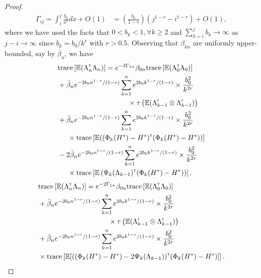 \begin{proof}
\begin{align*}
\Gamma_{ij} = \int_i^j \frac{b_0}{x^r} dx + O(1) &= \left(\frac{b_0}{1-r}\right)(j^{1-r}-i^{1-r}) +O(1),
\end{align*}
where we have used the facts that $0 < b_k < 1, \forall k \ge 2$ and 
$\sum_{k=i}^j b_k \to \infty$ as $j-i \to \infty$ since 
$b_k = b_0/k^r$ with $r > 0.5$.
Observing that $\beta_{kn}$ are uniformly upper-bounded, say by $\bar \beta_n$, we have
\begin{align}\label{eq:thmwts}
 & \text{trace} \left[\E (\Lambda_n \tr \Lambda_n)\right] =  e^{-2 \Gamma_{1n}} \beta_{0n} \text{trace} \left[\E (\Lambda_0 \tr \Lambda_0)\right]  \nonumber\\ 
&+ \bar \beta_n e^{-2 b_0 n^{1-r}/(1-r)} \sum_{k=1}^n e^{2 b_0 k^{1-r}/(1-r)}  \times \frac{b_0^2}{k^{2 r}} \nonumber\\
& \hspace{3.5cm} \times \tau\left(\E (\Lambda_{k-1}' \otimes \Lambda_{k-1}')\right)  \nonumber\\ 
&+ \bar \beta_n e^{-2 b_0 n^{1-r}/(1-r)} \sum_{k=1}^n e^{2 b_0 k^{1-r}/(1-r)}  \times \frac{b_0^2}{k^{2 r}}  \nonumber\\
&  \hspace{0.5cm}\times \text{trace}\left[\E ((\Phi_k(H^*) - H^*) \tr  (\Phi_k(H^*) - H^*))\right] \nonumber\\ &- 2 \bar \beta_n e^{-2 b_0 n^{1-r}/(1-r)} \sum_{k=1}^n e^{2 b_0 k^{1-r}/(1-r)}  \times \frac{b_0^2}{k^{2 r}}  \nonumber\\& \hspace{0.5cm} \times \text{trace} \left[\E\left(\Psi_k(\Lambda_{k-1}) \tr (\Phi_k(H^*) - H^*)\right)\right].
\end{align} 
\begin{align}\label{eq:thmcomb}
& \text{trace} \left[\E (\Lambda_n \tr \Lambda_n)\right] =  e^{-2 \Gamma_{1n}} \beta_{0n} \text{trace} \left[\E (\Lambda_0 \tr \Lambda_0)\right]  \nonumber\\ 
&+ \bar \beta_n e^{-2 b_0 n^{1-r}/(1-r)} \sum_{k=1}^n e^{2 b_0 k^{1-r}/(1-r)}  \times \frac{b_0^2}{k^{2 r}} \nonumber\\
& \hspace{3.5cm} \times \tau\left(\E (\Lambda_{k-1}' \otimes \Lambda_{k-1}')\right)  \nonumber\\ 
&+ \bar \beta_n e^{-2 b_0 n^{1-r}/(1-r)} \sum_{k=1}^n e^{2 b_0 k^{1-r}/(1-r)}  \times \frac{b_0^2}{k^{2 r}}  \nonumber\\
&\times \text{trace}\left[\E [((\Phi_k(H^*) - H^*) - 2 \Psi_k(\Lambda_{k-1}))\tr  (\Phi_k(H^*) - H^*)]\right] .

\end{align}
\end{proof}
